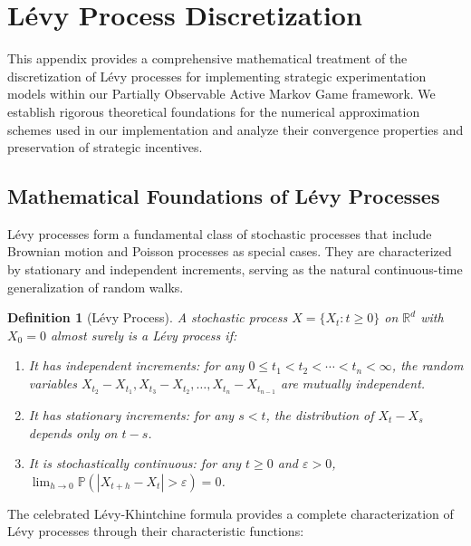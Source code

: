 \documentclass[a4paper,12pt]{report}
\newtheorem{definition}{Definition}
\begin{document}
\section{Lévy Process Discretization}
\label{appendix:levy_discretization}

This appendix provides a comprehensive mathematical treatment of the discretization of Lévy processes for implementing strategic experimentation models within our Partially Observable Active Markov Game framework. We establish rigorous theoretical foundations for the numerical approximation schemes used in our implementation and analyze their convergence properties and preservation of strategic incentives.

\subsection{Mathematical Foundations of Lévy Processes}
\label{appendix:levy_foundations}

Lévy processes form a fundamental class of stochastic processes that include Brownian motion and Poisson processes as special cases. They are characterized by stationary and independent increments, serving as the natural continuous-time generalization of random walks.

\begin{definition}[Lévy Process]
    A stochastic process $X = \{X_t : t \geq 0\}$ on $\mathbb{R}^d$ with $X_0 = 0$ almost surely is a Lévy process if:
    \begin{enumerate}
        \item It has independent increments: for any $0 \leq t_1 < t_2 < \cdots < t_n < \infty$, the random variables $X_{t_2} - X_{t_1}, X_{t_3} - X_{t_2}, \ldots, X_{t_n} - X_{t_{n-1}}$ are mutually independent.
        \item It has stationary increments: for any $s < t$, the distribution of $X_t - X_s$ depends only on $t-s$.
        \item It is stochastically continuous: for any $t \geq 0$ and $\varepsilon > 0$, $\lim_{h \to 0} \mathbb{P}(|X_{t+h} - X_t| > \varepsilon) = 0$.
    \end{enumerate}
\end{definition}

The celebrated Lévy-Khintchine formula provides a complete characterization of Lévy processes through their characteristic functions:
\end{document}
